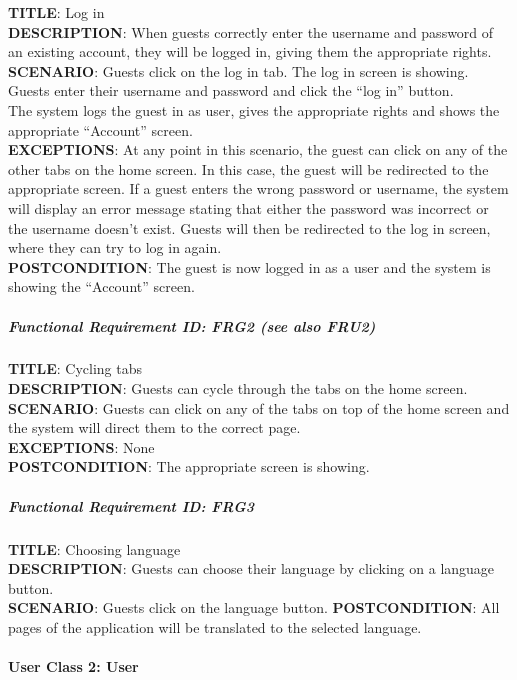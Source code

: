 \documentclass[12pt]{article}
\begin{document}
\textbf{TITLE}: Log in\\\textbf{DESCRIPTION}: When guests correctly
enter the username and password of an existing account, they will be
logged in, giving them the appropriate rights.\\\textbf{SCENARIO}:
Guests click on the log in tab. The log in screen is showing. Guests
enter their username and password and click the ``log in'' button.\\The
system logs the guest in as user, gives the appropriate rights and shows
the appropriate ``Account'' screen.\\\textbf{EXCEPTIONS}: At any point
in this scenario, the guest can click on any of the other tabs on the
home screen. In this case, the guest will be redirected to the
appropriate screen. If a guest enters the wrong password or username,
the system will display an error message stating that either the
password was incorrect or the username doesn't exist. Guests will then
be redirected to the log in screen, where they can try to log in
again.\\\textbf{POSTCONDITION}: The guest is now logged in as a user and
the system is showing the ``Account'' screen.

\subparagraph{Functional Requirement \textbf{ID}: FRG2 (see also
FRU2)}\label{functional-requirement-id-frg2-see-also-fru2}

\textbf{TITLE}: Cycling tabs\\\textbf{DESCRIPTION}: Guests can cycle
through the tabs on the home screen.\\\textbf{SCENARIO}: Guests can
click on any of the tabs on top of the home screen and the system will
direct them to the correct page.\\\textbf{EXCEPTIONS}:
None\\\textbf{POSTCONDITION}: The appropriate screen is showing.

\subparagraph{Functional Requirement \textbf{ID}:
FRG3}\label{functional-requirement-id-frg3}

\textbf{TITLE}: Choosing language\\\textbf{DESCRIPTION}: Guests can
choose their language by clicking on a language
button.\\\textbf{SCENARIO}: Guests click on the language button.
\textbf{POSTCONDITION}: All pages of the application will be translated
to the selected language.

\paragraph{User Class 2: User}\label{user-class-2-user}
\end{document}
